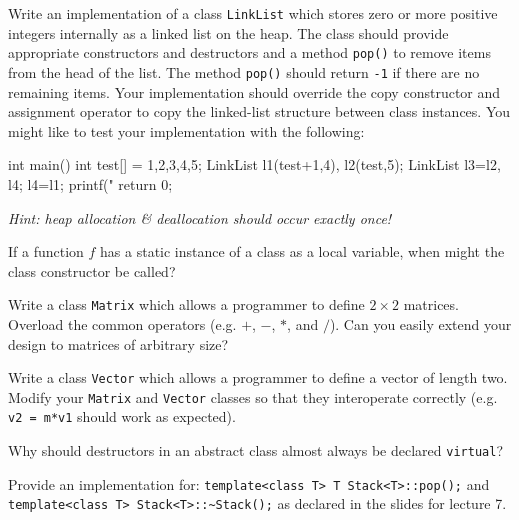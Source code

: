 \documentclass[NewMinted]{supervision}
\begin{document}
\begin{questions}
    \question
    Write an implementation of a class \lstinline|LinkList| which stores zero or more positive integers internally as a linked list on the heap. The class should provide appropriate constructors and destructors and a method \lstinline|pop()| to remove items from the head of the list. The method \lstinline|pop()| should return \lstinline|-1| if there are no remaining items. Your implementation should override the copy constructor and assignment operator to copy the linked-list structure between class instances. You might like to test your implementation with the following:

    \begin{cpp}
    int main() {
        int test[] = {1,2,3,4,5};
        LinkList l1(test+1,4), l2(test,5);
        LinkList l3=l2, l4;
        l4=l1;
        printf("%
        return 0;
    }
    \end{cpp}

    \textit{Hint: heap allocation \& deallocation should occur exactly once!}

    \begin{solution}
    \end{solution}

    \question
    If a function $f$ has a static instance of a class as a local variable, when might the class constructor be called?
    \begin{solution}
        
    \begin{solution}

    \question
    Write a class \lstinline|Matrix| which allows a programmer to define $2 \times 2$ matrices. Overload the common operators (e.g. $+$, $-$, $*$, and $/$). Can you easily extend your design to matrices of arbitrary size?

    \question
    Write a class \lstinline|Vector| which allows a programmer to define a vector of length two. Modify your \lstinline|Matrix| and \lstinline|Vector| classes so that they interoperate correctly (e.g. \lstinline|v2 = m*v1| should work as expected).

    \question
    Why should destructors in an abstract class almost always be declared \lstinline|virtual|?

    \question
    Provide an implementation for: \lstinline|template<class T> T Stack<T>::pop();| and \lstinline|template<class T> Stack<T>::~Stack();| as declared in the slides for lecture 7.


\end{solution}
\end{solution}
\end{questions}
\end{document}
